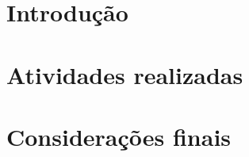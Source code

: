 \documentclass[
	12pt,				%
	oneside,			%
	a4paper,			%
	sumario=tradicional,
	english,			%
	french,				%
	spanish,			%
	brazil,				%
]{abntex2}
\begin{document}

\frenchspacing 


 \imprimirfolhaderosto

\tableofcontents*
\cleardoublepage

\textual
\pagestyle{simple}

\begingroup
\let\clearpage\relax


\chapter{Introdução}\label{ch::intro}


\chapter{Atividades realizadas}\label{ch::realizadas}


\chapter{Considerações finais}\label{ch::consideracoes}



\endgroup

\postextual




\printindex
\end{document}
